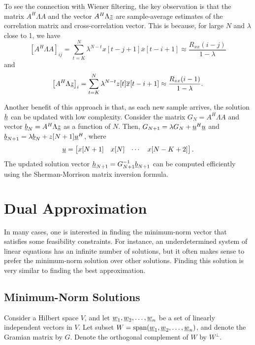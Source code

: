 To see the connection with Wiener filtering, the key observation is that the matrix $A^H \Lambda A$ and the vector $ A^H \Lambda \underline{z}$ are sample-average estimates of the correlation matrix and cross-correlation vector.
This is because, for large $N$ and $\lambda$ close to 1, we have
\[ \left[ A^H \Lambda A \right]_{ij} = \sum_{t=K}^N \lambda^{N-t} x[t-j+1] \overline{x}[t-i+1] \approx \frac{R_{xx}(i-j)}{1-\lambda} \]
and
\[ \left[ A^H \Lambda \underline{z} \right]_i = \sum_{t=K}^N \lambda^{N-t} z[t] \overline{x}[t-i+1] \approx \frac{R_{zx}(i-1)}{1-\lambda}. \]

Another benefit of this approach is that, as each new sample arrives, the solution $\underline{h}$ can be updated with low complexity.
Consider the matrix $G_N = A^H \Lambda A$ and vector $\underline{b}_N = A^H \Lambda \underline{z}$ as a function of $N$.
Then, $G_{N+1} = \lambda G_N + \underline{u}^H \underline{u}$ and $\underline{b}_{N+1} = \lambda \underline{b}_N + z[N+1] \underline{u}^H$, where
\begin{equation}
\underline{u} = \begin{bmatrix} x[N+1] & x[N] & \cdots & x[N-K+2] \end{bmatrix} .
\end{equation}
The updated solution vector $\underline{h}_{N+1} = G_{N+1}^{-1} \underline{b}_{N+1}$ can be computed efficiently using the Sherman-Morrison matrix inversion formula.


\section{Dual Approximation}

In many cases, one is interested in finding the minimum-norm vector that satisfies some feasibility constraints.
For instance, an underdetermined system of linear equations has an infinite number of solutions, but it often makes sense to prefer the minimum-norm solution over other solutions.
Finding this solution is very similar to finding the best approximation.


\subsection{Minimum-Norm Solutions}

Consider a Hilbert space $V$, and let $\underline{w}_1 ,\underline{w}_2 , \ldots, \underline{w}_n$ be a set of linearly independent vectors in $V$.
Let subset $W = \mathrm{span} ( \underline{w}_1 ,\underline{w}_2 , \ldots, \underline{w}_n )$, and denote the Gramian matrix by $G$.
Denote the orthogonal complement of $W$ by $W^{\bot}$.

